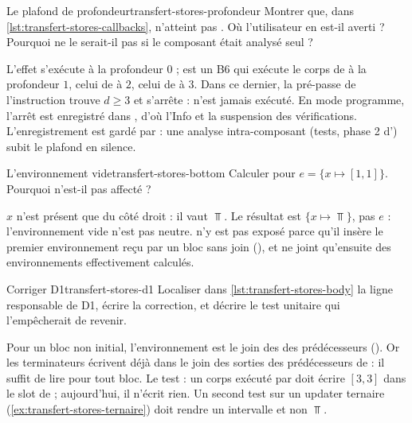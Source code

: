 \begin{exercice}{Le plafond de profondeur}{transfert-stores-profondeur}
  Montrer que, dans \cref{lst:transfert-stores-callbacks}, 
  n'atteint pas . Où l'utilisateur en est-il averti ? Pourquoi
  ne le serait-il pas si le composant était analysé seul ?
\end{exercice}
\begin{solution}
  L'effet s'exécute à la profondeur $0$ ;  est un B6 qui exécute
  le corps de  à la profondeur $1$, celui de  à $2$, celui
  de  à $3$. Dans ce dernier, la pré-passe de l'instruction
   trouve $d \geq 3$ et s'arrête :  n'est jamais
  exécuté. En mode programme, l'arrêt est enregistré dans
  , d'où l'Info  et la
  suspension des vérifications. L'enregistrement est gardé par
   : une analyse intra-composant (tests,
  phase 2 d') subit le plafond en silence.
\end{solution}

\begin{exercice}{L'environnement vide}{transfert-stores-bottom}
  Calculer  pour
  $e = \{x \mapsto [1,1]\}$. Pourquoi  n'est-il pas
  affecté ?
\end{exercice}
\begin{solution}
  $x$ n'est présent que du côté droit : il vaut $\Top$. Le résultat est
  $\{x \mapsto \Top\}$, pas $e$ : l'environnement vide n'est pas neutre.
   n'y est pas exposé parce qu'il insère le premier
  environnement reçu par un bloc sans join (),
  et ne joint qu'ensuite des environnements effectivement calculés.
\end{solution}

\begin{exercice}{Corriger D1}{transfert-stores-d1}
  Localiser dans \cref{lst:transfert-stores-body} la ligne responsable de D1,
  écrire la correction, et décrire le test unitaire qui l'empêcherait de
  revenir.
\end{exercice}
\begin{solution}
  Pour un bloc non initial, l'environnement est le join des
   des prédécesseurs
  (). Or les terminateurs
  écrivent déjà dans  le join des sorties des
  prédécesseurs de  : il suffit de lire
   pour
  tout bloc. Le test : un corps 
  exécuté par  doit écrire $[3,3]$ dans le slot de
   ; aujourd'hui, il n'écrit rien. Un second test sur un
  updater ternaire (\cref{ex:transfert-stores-ternaire}) doit rendre un
  intervalle et non $\Top$.
\end{solution}

